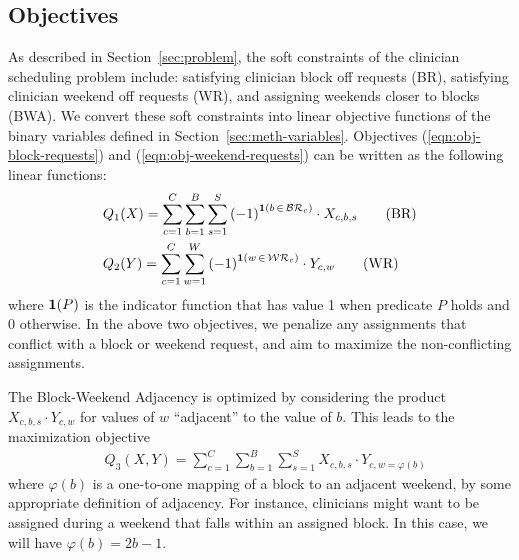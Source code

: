 \subsection{Objectives}\label{sec:meth-objectives}
As described in Section~\ref{sec:problem}, the soft constraints of the clinician
scheduling problem include: satisfying clinician block off requests (BR),
satisfying clinician weekend off requests (WR), and assigning weekends closer to
blocks (BWA). We convert these soft constraints into linear objective functions
of the binary variables defined in Section~\ref{sec:meth-variables}. Objectives
(\ref{eqn:obj-block-requests}) and (\ref{eqn:obj-weekend-requests}) can be
written as the following linear functions:  %
\begin{align}
&Q_1(X) = \sum_{c=1}^{C} \sum_{b=1}^{B} \sum_{s=1}^{S}
{(-1)}^{\bm{1}(b\,\in\,\mathcal{BR}_c)}\cdot X_{c, b, s} \tag{BR}
\label{eqn:obj-block-requests}\\
&Q_2(Y) = \sum_{c=1}^{C} \sum_{w=1}^{W}
{(-1)}^{\bm{1}(w\,\in\,\mathcal{WR}_c)}\cdot Y_{c, w} \tag{WR}
\label{eqn:obj-weekend-requests}
\end{align}
where $\bm{1}(P)$ is the indicator function that has value 1 when predicate $P$
holds and 0 otherwise. In the above two objectives, we penalize any assignments
that conflict with a block or weekend request, and aim to maximize the
non-conflicting assignments.

The Block-Weekend Adjacency is optimized by considering the product $X_{c, b,
	s}\cdot Y_{c, w}$ for values of $w$ ``adjacent'' to the value of $b$. This
leads
to the maximization objective %
\begin{align}
&Q_3(X, Y) = \sum_{c=1}^{C} \sum_{b=1}^{B} \sum_{s=1}^{S} X_{c, b, s}\cdot Y_{c,
	w=\varphi(b)} \tag{BWA} \label{eqn:obj-block-weekend-adj}
\end{align}
where $\varphi(b)$ is a one-to-one mapping of a block to an adjacent weekend, by
some appropriate definition of adjacency. For instance, clinicians might want to
be assigned during a weekend that falls within an assigned block. In this case,
we will have $\varphi(b) = 2b-1$.


